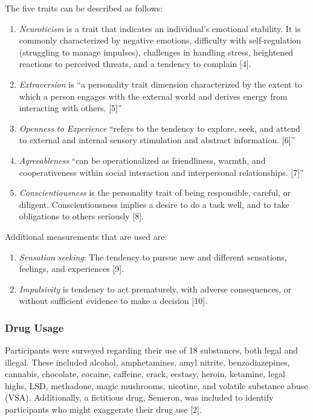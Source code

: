 \documentclass{article}
\begin{document}
The five traits can be described as follows:
\begin{enumerate}
    \item \textit{Neuroticism} is a trait that indicates an individual's emotional stability. It is commonly characterized by negative emotions, difficulty with self-regulation (struggling to manage impulses), challenges in handling stress, heightened reactions to perceived threats, and a tendency to complain [4].
    \item \textit{Extraversion} is ``a personality trait dimension characterized by the extent to which a person engages with the external world and derives energy from interacting with others. [5]''
    \item \textit{Openness to Experience} ``refers to the tendency to explore, seek, and attend to external and internal sensory stimulation and abstract information. [6]''
    \item \textit{Agreeableness} ``can be operationalized as friendliness, warmth, and cooperativeness within social interaction and interpersonal relationships. [7]''

    \newpage

    \item{}\textit{Conscientiousness} is the personality trait of being responsible, careful, or diligent. Conscientiousness implies a desire to do a task well, and to take obligations to others seriously [8].
\end{enumerate}

Additional measurements that are used are:
\begin{enumerate}
    \item \textit{Sensation seeking}: The tendency to pursue new and different sensations, feelings, and experiences [9]. 
    \item \textit{Impulsivity} is tendency to act prematurely, with adverse consequences, or without sufficient evidence to make a decision [10].
\end{enumerate}


\subsubsection{Drug Usage}
\hspace{1cm}Participants were surveyed regarding their use of 18 substances, both legal and illegal. These included alcohol, amphetamines, amyl nitrite, benzodiazepines, cannabis, chocolate, cocaine, caffeine, crack, ecstasy, heroin, ketamine, legal highs, LSD, methadone, magic mushrooms, nicotine, and volatile substance abuse (VSA). Additionally, a fictitious drug, Semeron, was included to identify participants who might exaggerate their drug use [2].
\end{document}
